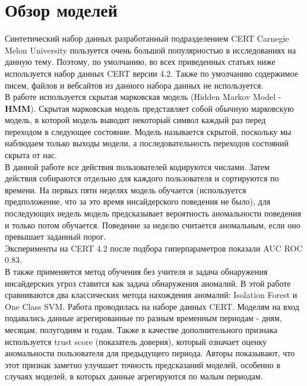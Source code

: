 \section{Обзор моделей}

Синтетический набор данных разработанный подразделением CERT Carnegie Melon University пользуется очень большой популярностью в исследованиях на данную тему. Поэтому, по умолчанию, во всех приведенных статьях ниже используется набор данных CERT версии 4.2. Также по умолчанию содержимое писем, файлов и вебсайтов из данного набора данных не используется.\\

В работе \cite{rashidNewTakeDetecting2016} используется скрытая марковская модель (Hidden Markov Model - \textbf{HMM}). Скрытая марковская модель представляет собой обычную марковскую модель, в которой модель выводит некоторый символ каждый раз перед переходом в следующее состояние. Модель называется скрытой, поскольку мы наблюдаем только выходы модели, а последовательность переходов состояний скрыта от нас.\\
В данной работе все действия пользователей кодируются числами. Затем действия собираются отдельно для каждого пользователя и сортируются по времени. На первых пяти неделях модель обучается (используется предположение, что за это время инсайдерского поведения не было), для последующих недель модель предсказывает вероятность аномальности поведения и только потом обучается. Поведение за неделю считается аномальным, если оно превышает заданный порог.\\
Эксперименты на CERT 4.2 после подбора гиперпараметров показали AUC ROC $0.83$.\\

В \cite{aldairiTrustAwareUnsupervised2019} также применяется метод обучения без учителя и задача обнаружения инсайдерских угроз ставится как задача обнаружения аномалий. В этой работе сравниваются два классических метода нахождения аномалий: Isolation Forest и One Class SVM. Работа проводилась на наборе данных CERT. Моделям на вход подавались данные агрегированные по разным временным периодам - дням, месяцам, полугодиям и годам. Также в качестве дополнительного признака используется trust score (показатель доверия), который означает оценку аномальности пользователя для предыдущего периода. Авторы показывают, что этот признак заметно улучшает точность предсказаний моделей, особенно в случаях моделей, в которых данные агрегируются по малым периодам.\\

